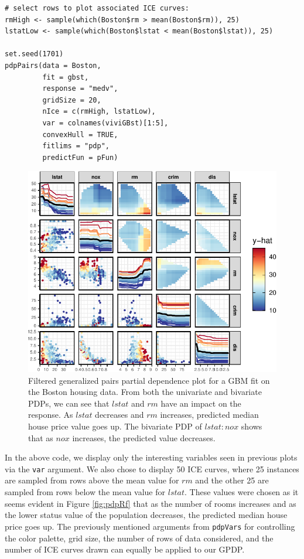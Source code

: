 \begin{verbatim}
# select rows to plot associated ICE curves:
rmHigh <- sample(which(Boston$rm > mean(Boston$rm)), 25)
lstatLow <- sample(which(Boston$lstat < mean(Boston$lstat)), 25)

set.seed(1701)
pdpPairs(data = Boston,
         fit = gbst,
         response = "medv",
         gridSize = 20,
         nIce = c(rmHigh, lstatLow),
         var = colnames(viviGBst)[1:5],
         convexHull = TRUE,
         fitlims = "pdp",
         predictFun = pFun)
\end{verbatim}

\begin{figure}

{\centering \includegraphics[width=0.75\linewidth]{vivid_files/figure-latex/gpdp-1} 

}

\caption{Filtered generalized pairs partial dependence plot for a GBM fit on the Boston housing data. From both the univariate and bivariate PDPs, we can see that $lstat$ and $rm$ have an impact on the response. As $lstat$ decreases and $rm$ increases, predicted median house price value goes up. The bivariate PDP of $lstat:nox$ shows that as $nox$ increases, the predicted value decreases.}\label{fig:gpdp}
\end{figure}

In the above code, we display only the interesting variables seen in previous plots via the \texttt{var} argument. We also chose to display 50 ICE curves, where 25 instances are sampled from rows above the mean value for \(rm\) and the other 25 are sampled from rows below the mean value for \(lstat\). These values were chosen as it seems evident in Figure \ref{fig:pdpRf} that as the number of rooms increases and as the lower status value of the population decreases, the predicted median house price goes up. The previously mentioned arguments from \texttt{pdpVars} for controlling the color palette, grid size, the number of rows of data considered, and the number of ICE curves drawn can equally be applied to our GPDP.

